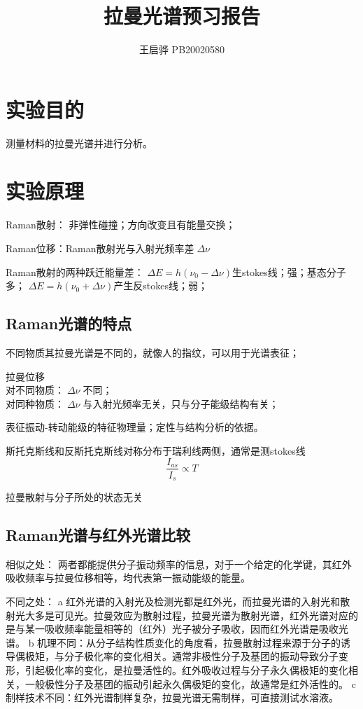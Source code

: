 \documentclass{article}
\title{\songti \zihao{2}\bfseries 拉曼光谱预习报告}
\author{王启骅 PB20020580}
\begin{document}
	\maketitle
	\section{实验目的}
	测量材料的拉曼光谱并进行分析。
	\section{实验原理}
	Raman散射：
       非弹性碰撞；方向改变且有能量交换；


Raman位移：Raman散射光与入射光频率差$ \Delta\nu $


Raman散射的两种跃迁能量差：
$ \Delta E=h(\nu_0-\Delta \nu) $生stokes线；强；基态分子多；
$ \Delta E=h(\nu_0+\Delta \nu) $产生反stokes线；弱；

\subsection{Raman光谱的特点}
不同物质其拉曼光谱是不同的，就像人的指纹，可以用于光谱表征；


拉曼位移\\
对不同物质：$ \Delta\nu $不同；\\
对同种物质：$ \Delta\nu $与入射光频率无关，只与分子能级结构有关；


表征振动-转动能级的特征物理量；定性与结构分析的依据。


斯托克斯线和反斯托克斯线对称分布于瑞利线两侧，通常是测stokes线
\begin{equation}
	\frac{I_{as}}{I_s}\propto T
\end{equation}


拉曼散射与分子所处的状态无关

\subsection{Raman光谱与红外光谱比较}
相似之处：
 两者都能提供分子振动频率的信息，对于一个给定的化学键，其红外吸收频率与拉曼位移相等，均代表第一振动能级的能量。
 
 
 不同之处：
a 红外光谱的入射光及检测光都是红外光，而拉曼光谱的入射光和散射光大多是可见光。拉曼效应为散射过程，拉曼光谱为散射光谱，红外光谱对应的是与某一吸收频率能量相等的（红外）光子被分子吸收，因而红外光谱是吸收光谱。
b 机理不同：从分子结构性质变化的角度看，拉曼散射过程来源于分子的诱导偶极矩，与分子极化率的变化相关。通常非极性分子及基团的振动导致分子变形，引起极化率的变化，是拉曼活性的。红外吸收过程与分子永久偶极矩的变化相关，一般极性分子及基团的振动引起永久偶极矩的变化，故通常是红外活性的。
c 制样技术不同：红外光谱制样复杂，拉曼光谱无需制样，可直接测试水溶液。
\end{document}

